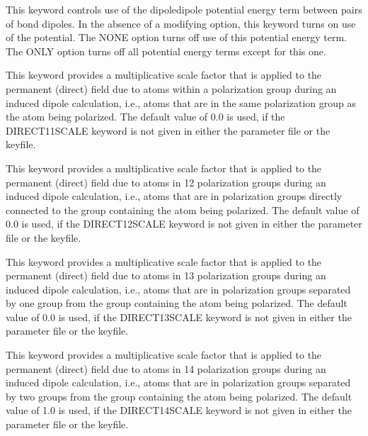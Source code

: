 \documentclass[letterpaper,11pt,english]{sphinxmanual}
\begin{document}
  This keyword controls use of the dipole\sphinxhyphen{}dipole potential energy term between pairs of bond dipoles. In the absence of a modifying option, this keyword turns on use of the potential. The NONE option turns off use of this potential energy term. The ONLY option turns off all potential energy terms except for this one.

  This keyword provides a multiplicative scale factor that is applied to the permanent (direct) field due to atoms within a polarization group during an induced dipole calculation, i.e., atoms that are in the same polarization group as the atom being polarized. The default value of 0.0 is used, if the DIRECT\sphinxhyphen{}11\sphinxhyphen{}SCALE keyword is not given in either the parameter file or the keyfile.

  This keyword provides a multiplicative scale factor that is applied to the permanent (direct) field due to atoms in 1\sphinxhyphen{}2 polarization groups during an induced dipole calculation, i.e., atoms that are in polarization groups directly connected to the group containing the atom being polarized. The default value of 0.0 is used, if the DIRECT\sphinxhyphen{}12\sphinxhyphen{}SCALE keyword is not given in either the parameter file or the keyfile.

  This keyword provides a multiplicative scale factor that is applied to the permanent (direct) field due to atoms in 1\sphinxhyphen{}3 polarization groups during an induced dipole calculation, i.e., atoms that are in polarization groups separated by one group from the group containing the atom being polarized. The default value of 0.0 is used, if the DIRECT\sphinxhyphen{}13\sphinxhyphen{}SCALE keyword is not given in either the parameter file or the keyfile.

  This keyword provides a multiplicative scale factor that is applied to the permanent (direct) field due to atoms in 1\sphinxhyphen{}4 polarization groups during an induced dipole calculation, i.e., atoms that are in polarization groups separated by two groups from the group containing the atom being polarized. The default value of 1.0 is used, if the DIRECT\sphinxhyphen{}14\sphinxhyphen{}SCALE keyword is not given in either the parameter file or the keyfile.
\end{document}
